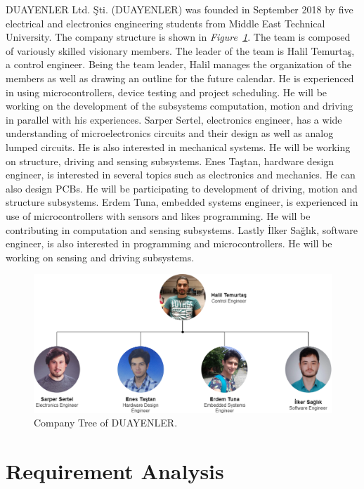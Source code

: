 \documentclass[a4paper,12pt]{article}
\begin{document}
	DUAYENLER Ltd. Şti. (DUAYENLER) was founded in September 2018 by five electrical and electronics engineering students from Middle East Technical University. The company structure is shown in \textit{Figure~\ref{fig:company_tree}}. The team is composed of variously skilled visionary members. The leader of the team is Halil Temurtaş, a control engineer. Being the team leader, Halil manages the organization of the members as well as drawing an outline for the future calendar. He is experienced in using microcontrollers, device testing and project scheduling. He will be working on the development of the subsystems computation, motion and driving in parallel with his experiences. Sarper Sertel, electronics engineer, has a wide understanding of microelectronics circuits and their design as well as analog lumped circuits. He is also interested in mechanical systems. He will be working on structure, driving and sensing subsystems. Enes Taştan, hardware design engineer, is interested in several topics such as electronics and mechanics. He can also design PCBs. He will be participating to development of driving, motion and structure subsystems. Erdem Tuna, embedded systems engineer, is experienced in use of microcontrollers with sensors and likes programming. He will be contributing in computation and sensing subsystems. Lastly İlker Sağlık, software engineer, is also interested in programming and microcontrollers. He will be working on sensing and driving subsystems.

\begin{figure}[t!]
	\centering
	\includegraphics[width=\textwidth,height=\textheight,keepaspectratio]{../../Documents/company/company-tree} 
	\caption{\label{fig:company_tree}Company Tree of DUAYENLER.}
\end{figure}


\section{Requirement Analysis}
	
\end{document}
